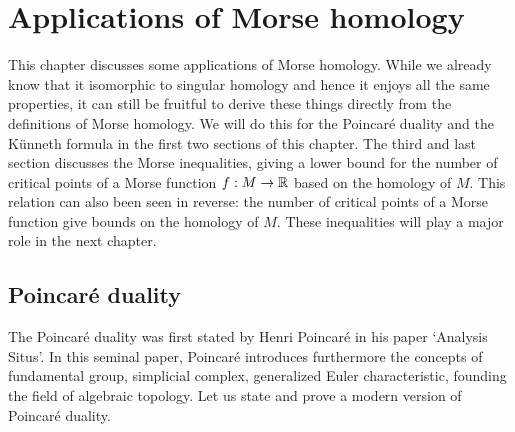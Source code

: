 \chapter{Applications of Morse homology}
\label{chap:app-morse-homology}

This chapter discusses some applications of Morse homology.
While we already know that it isomorphic to singular homology and hence it enjoys all the same properties, it can still be fruitful to derive these things directly from the definitions of Morse homology.
We will do this for the Poincaré duality and the Künneth formula in the first two sections of this chapter.
The third and last section discusses the Morse inequalities, giving a lower bound for the number of critical points of a Morse function $f: M \to  \mathbb{R}$ based on the homology of $M$.
This relation can also been seen in reverse: the number of critical points of a Morse function give bounds on the homology of $M$.
These inequalities will play a major role in the next chapter.

\section{Poincaré duality}
The Poincaré duality was first stated by Henri Poincaré in his paper `Analysis Situs'.
In this seminal paper, Poincaré introduces furthermore the concepts of fundamental group, simplicial complex, generalized Euler characteristic, founding the field of algebraic topology. Let us state and prove a modern version of Poincaré duality.

